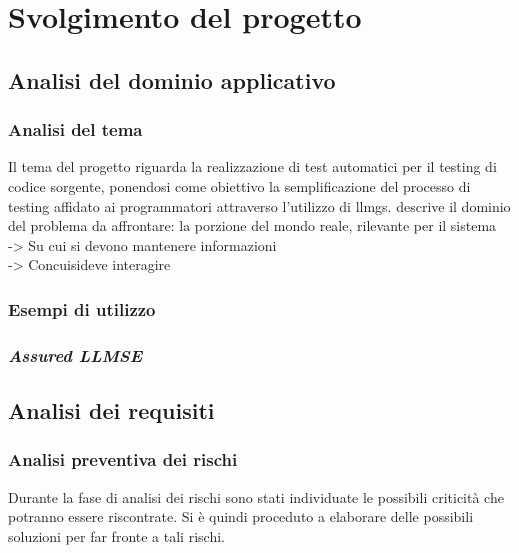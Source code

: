 \chapter{Svolgimento del progetto}
\label{chap:descrizione-stage}
\section{Analisi del dominio applicativo}
    \subsection{Analisi del tema}
    Il tema del progetto riguarda la realizzazione di test automatici per il testing di codice sorgente, ponendosi come
    obiettivo la semplificazione del processo di testing affidato ai programmatori attraverso l'utilizzo di \glspl{llmg}.
    descrive il dominio del problema da affrontare:
    la porzione del mondo reale, rilevante per il sistema\\
    -> Su cui si devono mantenere informazioni\\
    -> Concuisideve interagire
    \subsection{Esempi di utilizzo}
    \subsection{\textit{Assured LLMSE}}
    

\section{Analisi dei requisiti}
    \subsection{Analisi preventiva dei rischi}
    Durante la fase di analisi dei rischi sono stati individuate le possibili criticità che potranno essere riscontrate.
    Si è quindi proceduto a elaborare delle possibili soluzioni per far fronte a tali rischi.

